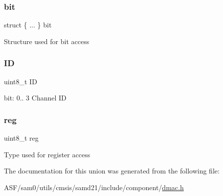 \subsubsection{\texorpdfstring{bit}{bit}}
{\footnotesize\ttfamily struct \{ ... \}   bit}

Structure used for bit access \mbox{\label{union_d_m_a_c___c_h_i_d___type_ae05e4021c05cb62085215a5b3d03c0bc}} 
\subsubsection{\texorpdfstring{ID}{ID}}
{\footnotesize\ttfamily uint8\+\_\+t ID}

bit\+: 0.. 3 Channel ID \mbox{\label{union_d_m_a_c___c_h_i_d___type_a9428adc9af4653a2050e2536b55dec8d}} 
\subsubsection{\texorpdfstring{reg}{reg}}
{\footnotesize\ttfamily uint8\+\_\+t reg}

Type used for register access 

The documentation for this union was generated from the following file\+:\begin{DoxyCompactItemize}
\item 
A\+S\+F/sam0/utils/cmsis/samd21/include/component/\mbox{\hyperlink{component_2dmac_8h}{dmac.\+h}}\end{DoxyCompactItemize}
